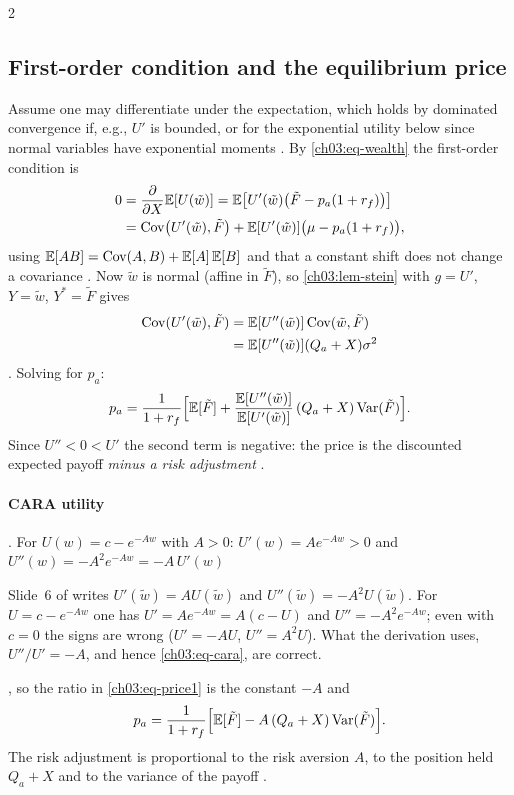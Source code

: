 \begin{paracol}{2}
\subsection{First-order condition and the equilibrium price}
Assume one may differentiate under the expectation, which holds by
dominated convergence if, e.g., $U'$ is bounded, or for the exponential
utility below since normal variables have exponential moments
. By \eqref{ch03:eq-wealth} the first-order
condition is
\begin{align*}
  0&=\frac{\partial}{\partial X}\mathbb{E}[U(\tilde w)]
  =\mathbb{E}\bigl[U'(\tilde w)\bigl(\tilde F-p_a(1+r_f)\bigr)\bigr] \\
   &=\operatorname{Cov}\bigl(U'(\tilde w),\tilde F\bigr)
   +\mathbb{E}[U'(\tilde w)]\bigl(\mu-p_a(1+r_f)\bigr),
\end{align*}
using $\mathbb{E}[AB]=\operatorname{Cov}(A,B)+\mathbb{E}[A]\,\mathbb{E}[B]$ and that a constant shift does not
change a covariance . Now $\tilde w$ is normal (affine
in $\tilde F$), so \cref{ch03:lem-stein} with $g=U'$, $Y=\tilde w$,
$Y^*=\tilde F$ gives
\begin{align*}
  \operatorname{Cov}(U'(\tilde w),\tilde F)&=\mathbb{E}[U''(\tilde w)]\operatorname{Cov}(\tilde w,\tilde F)\\
  &=\mathbb{E}[U''(\tilde w)](Q_a+X)\sigma^2
\end{align*}
. Solving for $p_a$:
\begin{equation}\label{ch03:eq-price1}
  p_a=\frac{1}{1+r_f}\Bigl[\mathbb{E}[\tilde F]
  +\frac{\mathbb{E}[U''(\tilde w)]}{\mathbb{E}[U'(\tilde w)]}\,(Q_a+X)\operatorname{Var}(\tilde F)\Bigr].
\end{equation}
Since $U''<0<U'$ the second term is negative: the price is the
discounted expected payoff \emph{minus a risk adjustment}
.

\paragraph{CARA utility} . For $U(w)=c-e^{-Aw}$ with
$A>0$: $U'(w)=Ae^{-Aw}>0$ and $U''(w)=-A^2e^{-Aw}=-A\,U'(w)$\begin{coursenote}
Slide~6 of  writes $U'(\tilde w)=AU(\tilde w)$ and $U''(\tilde w)=-A^2U(\tilde w)$. For $U=c-e^{-Aw}$ one has
$U'=Ae^{-Aw}=A(c-U)$ and $U''=-A^2e^{-Aw}$; even with $c=0$ the signs are wrong ($U'=-AU$, $U''=A^2U$). What the
derivation uses, $U''/U'=-A$, and hence \eqref{ch03:eq-cara}, are correct.
\end{coursenote}, so the
ratio in \eqref{ch03:eq-price1} is the constant $-A$ and
\begin{equation}\label{ch03:eq-cara}
  p_a=\frac{1}{1+r_f}\Bigl[\mathbb{E}[\tilde F]-A\,(Q_a+X)\operatorname{Var}(\tilde F)\Bigr].
\end{equation}
The risk adjustment is proportional to the risk aversion $A$, to the
position held $Q_a+X$ and to the variance of the payoff
.


\end{paracol}
